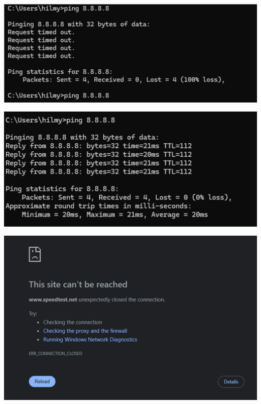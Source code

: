 \begin{enumerate}
    \begin{center}
        \includegraphics[scale=0.5]{P1/img/ireng1.png}
    \end{center}
    \begin{center}
        \includegraphics[scale=0.5]{P1/img/ireng2.png}
    \end{center}
    \begin{center}
        \includegraphics[scale=0.5]{P1/img/ireng3.png}
    \end{center}
    \begin{center}

\end{center}
\end{enumerate}
